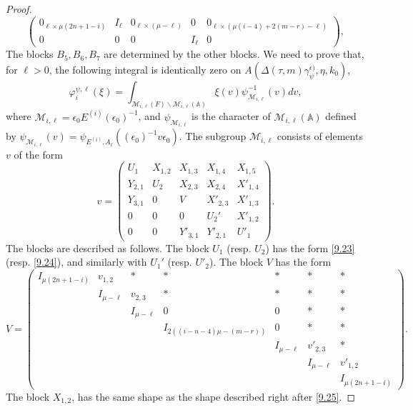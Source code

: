 \documentclass[12pts]{amsart}
\newcommand{\BA}{{\mathbb {A}}}
\begin{document}
\begin{proof}
\begin{equation}
\begin{pmatrix}0_{\ell\times \mu(2n+1-i)}& I_\ell & 0_{\ell\times (\mu-\ell)}& 0&0_{\ell\times (\mu(i-4)+2(m-r)-\ell)}\\                        
0& 0& 0&  I_\ell & 0 \end{pmatrix},
\end{equation}
The blocks $B_5, B_6, B_7$ are determined by the other blocks. We need to prove that, for $\ell>0$, the following integral is identically zero on $A(\Delta(\tau,m)\gamma_\psi^{\epsilon)},\eta,k_0)$,
\begin{equation}\label{11.35}
\varphi_i^{\psi,\ell}(\xi)=
\int_{\mathcal{M}_{i,\ell}(F)\backslash
	\mathcal{M}_{i,\ell}(\BA)}\xi(v)\psi^{-1}_{\mathcal{M}_{i,\ell}}(v)dv, 
\end{equation}
where $\mathcal{M}_{i,\ell}=\epsilon_0E^{(i)}(\epsilon_0)^{-1}$, and $\psi_{\mathcal{M}_{i,\ell}}$ is the character of $\mathcal{M}_{i,\ell}(\BA)$ defined by $\psi_{\mathcal{M}_{i,\ell}}(v)=\psi_{E^{(i)},A_\ell}((\epsilon_0)^{-1}v\epsilon_0)$. The subgroup $\mathcal{M}_{i,\ell}$ consists of elements $v$ of the form 
\begin{equation}\label{11.36}
v=\begin{pmatrix}U_1&X_{1,2}&X_{1,3}&X_{1,4}&X_{1,5}\\Y_{2,1}&U_2&X_{2,3}&X_{2,4}&X'_{1,4}\\
Y_{3,1}&0&V&X'_{2,3}&X'_{1,3}\\0&0&0&U_2'&X'_{1,2}\\0&0&Y'_{3,1}&Y'_{2,1}&U'_1\end{pmatrix}.
\end{equation}
The blocks are described as follows. The block $U_1$ (resp. $U_2$) has the form \eqref{9.23} (resp. \eqref{9.24}),  
and similarly with $U_1'$ (resp. $U'_2$). The block $V$ has the form
\begin{equation}\label{11.37}
V=\begin{pmatrix}I_{\mu(2n+1-i)}&v_{1,2}&\ast&\ast&\ast&\ast&\ast\\&I_{\mu-\ell}&v_{2,3}&\ast&\ast&\ast&\ast\\&&I_{\mu-\ell}&0&0&\ast&\ast\\&&&I_{2((i-n-4)\mu-(m-r))}&0&\ast&\ast\\&&&&I_{\mu-\ell}&v'_{2,3}&\ast\\&&&&&I_{\mu-\ell}&v'_{1,2}\\&&&&&&I_{\mu(2n+1-i)}\end{pmatrix}.
\end{equation}
The block $X_{1,2}$, has the same shape as the shape described right after \eqref{9.25}. 

\end{proof}
\end{document}
